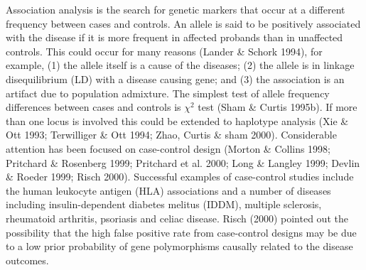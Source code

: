 Association analysis is the search for genetic markers that occur at a
different frequency between cases and controls.  An allele is said to be
positively associated with the disease if it is more frequent in affected
probands than in unaffected controls.  This could occur for many reasons
(Lander \& Schork 1994), for example, (1) the allele itself is a cause of the
diseases; (2) the allele is in linkage disequilibrium (LD) with a disease
causing gene; and (3) the association is an artifact due to population
admixture.  The simplest test of allele frequency differences between cases and
controls is $\chi^2$ test (Sham \& Curtis 1995b).  If more than one locus is
involved this could be extended to haplotype analysis (Xie \& Ott 1993;
Terwilliger \& Ott 1994; Zhao, Curtis \& sham 2000).  Considerable attention
has been focused on case-control design (Morton \& Collins 1998; Pritchard \&
Rosenberg 1999; Pritchard et al.  2000; Long \& Langley 1999; Devlin \& Roeder
1999; Risch 2000).  Successful examples of case-control studies include the
human leukocyte antigen (HLA) associations and a number of diseases including
insulin-dependent diabetes melitus (IDDM), multiple sclerosis, rheumatoid
arthritis, psoriasis and celiac disease.  Risch (2000) pointed out the
possibility that the high false positive rate from case-control designs may be
due to a low prior probability of gene polymorphisms causally related to the
disease outcomes.

